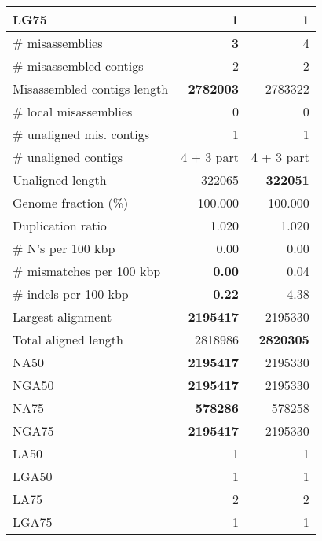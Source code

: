 \documentclass[12pt,a4paper]{article}
\begin{document}
\begin{table}[ht]
\begin{center}
\begin{tabular}{|l*{2}{|r}|}
LG75 & 1 & 1 \\ \hline
\# misassemblies & {\bf 3} & 4 \\ \hline
\# misassembled contigs & 2 & 2 \\ \hline
Misassembled contigs length & {\bf 2782003} & 2783322 \\ \hline
\# local misassemblies & 0 & 0 \\ \hline
\# unaligned mis. contigs & 1 & 1 \\ \hline
\# unaligned contigs & 4 + 3 part & 4 + 3 part \\ \hline
Unaligned length & 322065 & {\bf 322051} \\ \hline
Genome fraction (\%) & 100.000 & 100.000 \\ \hline
Duplication ratio & 1.020 & 1.020 \\ \hline
\# N's per 100 kbp & 0.00 & 0.00 \\ \hline
\# mismatches per 100 kbp & {\bf 0.00} & 0.04 \\ \hline
\# indels per 100 kbp & {\bf 0.22} & 4.38 \\ \hline
Largest alignment & {\bf 2195417} & 2195330 \\ \hline
Total aligned length & 2818986 & {\bf 2820305} \\ \hline
NA50 & {\bf 2195417} & 2195330 \\ \hline
NGA50 & {\bf 2195417} & 2195330 \\ \hline
NA75 & {\bf 578286} & 578258 \\ \hline
NGA75 & {\bf 2195417} & 2195330 \\ \hline
LA50 & 1 & 1 \\ \hline
LGA50 & 1 & 1 \\ \hline
LA75 & 2 & 2 \\ \hline
LGA75 & 1 & 1 \\ \hline
\end{tabular}
\end{center}
\end{table}
\end{document}
